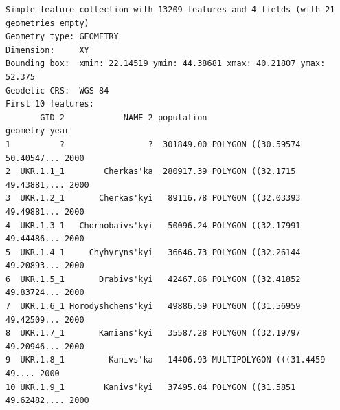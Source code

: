 \documentclass[
  letterpaper,
  DIV=11,
  numbers=noendperiod]{scrreprt}
\newenvironment{Shaded}{\begin{snugshade}}{\end{snugshade}}
\newcommand{\AttributeTok}[1]{\textcolor[rgb]{0.40,0.45,0.13}{#1}}
\newcommand{\CommentTok}[1]{\textcolor[rgb]{0.37,0.37,0.37}{#1}}
\newcommand{\ControlFlowTok}[1]{\textcolor[rgb]{0.00,0.23,0.31}{#1}}
\newcommand{\DecValTok}[1]{\textcolor[rgb]{0.68,0.00,0.00}{#1}}
\newcommand{\FunctionTok}[1]{\textcolor[rgb]{0.28,0.35,0.67}{#1}}
\newcommand{\NormalTok}[1]{\textcolor[rgb]{0.00,0.23,0.31}{#1}}
\newcommand{\OtherTok}[1]{\textcolor[rgb]{0.00,0.23,0.31}{#1}}
\newcommand{\SpecialCharTok}[1]{\textcolor[rgb]{0.37,0.37,0.37}{#1}}
\begin{document}
\begin{Shaded}
\end{Shaded}

\begin{verbatim}
Simple feature collection with 13209 features and 4 fields (with 21 geometries empty)
Geometry type: GEOMETRY
Dimension:     XY
Bounding box:  xmin: 22.14519 ymin: 44.38681 xmax: 40.21807 ymax: 52.375
Geodetic CRS:  WGS 84
First 10 features:
       GID_2            NAME_2 population                       geometry year
1          ?                 ?  301849.00 POLYGON ((30.59574 50.40547... 2000
2  UKR.1.1_1        Cherkas'ka  280917.39 POLYGON ((32.1715 49.43881,... 2000
3  UKR.1.2_1       Cherkas'kyi   89116.78 POLYGON ((32.03393 49.49881... 2000
4  UKR.1.3_1   Chornobaivs'kyi   50096.24 POLYGON ((32.17991 49.44486... 2000
5  UKR.1.4_1     Chyhyryns'kyi   36646.73 POLYGON ((32.26144 49.20893... 2000
6  UKR.1.5_1       Drabivs'kyi   42467.86 POLYGON ((32.41852 49.83724... 2000
7  UKR.1.6_1 Horodyshchens'kyi   49886.59 POLYGON ((31.56959 49.42509... 2000
8  UKR.1.7_1       Kamians'kyi   35587.28 POLYGON ((32.19797 49.20946... 2000
9  UKR.1.8_1         Kanivs'ka   14406.93 MULTIPOLYGON (((31.4459 49.... 2000
10 UKR.1.9_1        Kanivs'kyi   37495.04 POLYGON ((31.5851 49.62482,... 2000
\end{verbatim}
\end{document}
